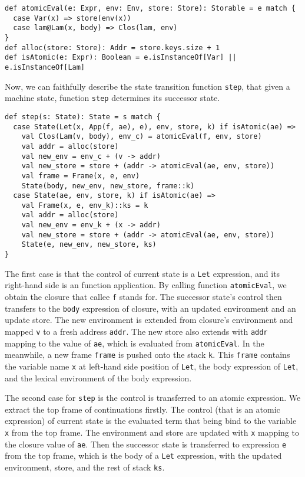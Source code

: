 \documentclass[acmsmall,review,anonymous]{acmart}\settopmatter{printfolios=true,printccs=false,printacmref=false}
\begin{document}
\begin{verbatim}
def atomicEval(e: Expr, env: Env, store: Store): Storable = e match {
  case Var(x) => store(env(x))
  case lam@Lam(x, body) => Clos(lam, env)
}
def alloc(store: Store): Addr = store.keys.size + 1
def isAtomic(e: Expr): Boolean = e.isInstanceOf[Var] || e.isInstanceOf[Lam]
\end{verbatim}

Now, we can faithfully describe the state transition function \texttt{step},
that given a machine state, function \texttt{step} determines its successor state.

\begin{verbatim}
def step(s: State): State = s match {
  case State(Let(x, App(f, ae), e), env, store, k) if isAtomic(ae) =>
    val Clos(Lam(v, body), env_c) = atomicEval(f, env, store)
    val addr = alloc(store)
    val new_env = env_c + (v -> addr)
    val new_store = store + (addr -> atomicEval(ae, env, store))
    val frame = Frame(x, e, env)
    State(body, new_env, new_store, frame::k)
  case State(ae, env, store, k) if isAtomic(ae) =>
    val Frame(x, e, env_k)::ks = k
    val addr = alloc(store)
    val new_env = env_k + (x -> addr)
    val new_store = store + (addr -> atomicEval(ae, env, store))
    State(e, new_env, new_store, ks)
}
\end{verbatim}

The first case is that the control of current state is a \texttt{Let} expression,
and its right-hand side is an function application.
By calling function \texttt{atomicEval}, we obtain the closure that callee \texttt{f} stands for.
The successor state's control then transfers to the \texttt{body} expression of closure,
with an updated environment and an update store. The new environment is extended
from closure's environment and mapped \texttt{v} to a fresh address \texttt{addr}.
The new store also extends with \texttt{addr} mapping to the value of \texttt{ae},
which is evaluated from \texttt{atomicEval}.
In the meanwhile, a new frame \texttt{frame} is pushed onto the stack \texttt{k}.
This \texttt{frame} contains the variable name \texttt{x} at left-hand side position of \texttt{Let},
the body expression of \texttt{Let}, and the lexical environment of the body expression.

The second case for \texttt{step} is the control is transferred to an atomic expression.
We extract the top frame of continuations firstly.
The control (that is an atomic expression) of current state is the evaluated term
that being bind to the variable \texttt{x} from the top frame.
The environment and store are updated with \texttt{x} mapping to the closure value of \texttt{ae}.
Then the successor state is transferred to expression \texttt{e} from the top frame,
which is the body of a \texttt{Let} expression, with the updated environment, store, and
the rest of stack \texttt{ks}.
\end{document}
